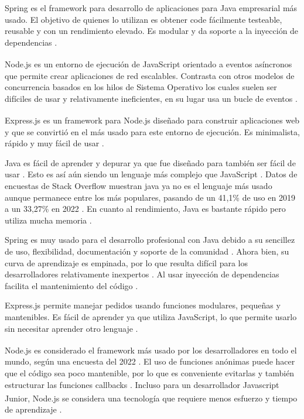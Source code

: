 \documentclass{article}
\begin{document}
Spring es el framework para desarrollo de aplicaciones para Java empresarial más usado. El objetivo de quienes lo utilizan es obtener code fácilmente testeable, reusable y con un rendimiento elevado. Es modular y da soporte a la inyección de dependencias \parencite{tutorialspointSpring}.

Node.js\textsuperscript{\textregistered} es un entorno de ejecución de JavaScript orientado a eventos asíncronos que permite crear aplicaciones de red escalables. Contrasta con otros modelos de concurrencia basados en los hilos de Sistema Operativo los cuales suelen ser difíciles de usar y relativamente ineficientes, en su lugar usa un bucle de eventos \parencite{aboutNode}.

Express.js es un framework para Node.js\textsuperscript{\textregistered} diseñado para construir aplicaciones web y que se convirtió en el más usado para este entorno de ejecución. Es minimalista, rápido y muy fácil de usar \parencite{kinstaExpress}.

Java es fácil de aprender y depurar ya que fue diseñado para también ser fácil de usar \parencite{ibmJava}. Esto es así aún siendo un lenguaje más complejo que JavaScript \parencite{lighthouselabsJavaVSJavscript}. Datos de encuestas de Stack Overflow muestran java ya no es el lenguaje más usado aunque permanece entre los más populares, pasando de un 41,1\% de uso en 2019 a un 33,27\% en 2022 \parencite{devmJava}. En cuanto al rendimiento, Java es bastante rápido pero utiliza mucha memoria \parencite{akkiJava}.

Spring es muy usado para el desarrollo profesional con Java debido a su sencillez de uso, flexibilidad, documentación y soporte de la comunidad \parencite{flexipleJava}. Ahora bien, su curva de aprendizaje es empinada, por lo que resulta difícil para los desarrolladores relativamente inexpertos \parencite{adservio}. Al usar inyección de dependencias facilita el mantenimiento del código \parencite{turingSpring}.

Express.js permite manejar pedidos usando funciones modulares, pequeñas y mantenibles. Es fácil de aprender ya que utiliza JavaScript, lo que permite usarlo sin necesitar aprender otro lenguaje \parencite{linuxhintExpress}. 

Node.js\textsuperscript{\textregistered} es considerado el framework más usado por los desarrolladores en todo el mundo, según una encuesta del 2022 \parencite{statistaFrameworks}. El uso de funciones anónimas puede hacer que el código sea poco mantenible, por lo que es conveniente evitarlas y también estructurar las funciones callbacks \parencite{packtpub}. Incluso para un desarrollador Javascript Junior, Node.js\textsuperscript{\textregistered} se considera una tecnología que requiere menos esfuerzo y tiempo de aprendizaje \parencite{simplilearnNode}.
\end{document}
